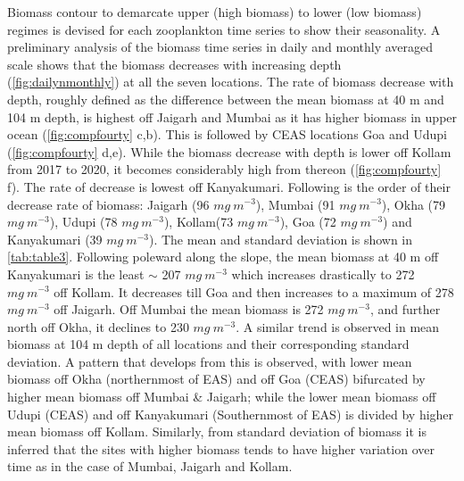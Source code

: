 \documentclass{article}
\begin{document}
	Biomass contour to demarcate upper (high biomass) to lower (low biomass) regimes is devised for each zooplankton time series to show their seasonality. A preliminary analysis of the biomass time series in daily and monthly averaged scale shows that the biomass decreases with increasing depth (\cref{fig:dailynmonthly}) at all the seven locations. The rate of biomass decrease with depth, roughly defined as the difference between the mean biomass at 40 m  and 104 m depth, is highest off Jaigarh and Mumbai as it has higher biomass in upper ocean (\cref{fig:compfourty} c,b). This is followed by CEAS locations Goa and Udupi (\cref{fig:compfourty} d,e). While the biomass decrease with depth is lower off Kollam from 2017 to 2020, it becomes considerably high from thereon (\cref{fig:compfourty} f). The rate of decrease is lowest off Kanyakumari. Following is the order of their decrease rate of biomass: Jaigarh (96 $mg\ m^{-3}$), Mumbai (91 $mg\ m^{-3}$), Okha (79 $mg\ m^{-3}$), Udupi (78 $mg\ m^{-3}$), Kollam(73 $mg\ m^{-3}$), Goa (72 $mg\ m^{-3}$) and Kanyakumari (39 $mg\ m^{-3}$).  The mean and standard deviation is shown in \autoref{tab:table3}. Following poleward along the slope, the mean biomass at 40 m off Kanyakumari is the least $\sim$ 207 $mg\ m^{-3}$ which increases drastically to 272 $mg\ m^{-3}$ off Kollam. It decreases till Goa and then increases to a maximum of 278 $mg\ m^{-3}$ off Jaigarh. Off Mumbai the mean biomass is 272 $mg\ m^{-3}$, and further north off Okha, it declines to 230 $mg\ m^{-3}$. A similar trend is observed in mean biomass at 104 m depth of all locations and their corresponding standard deviation. A pattern that develops from this is observed, with lower mean biomass off Okha (northernmost of EAS) and off Goa (CEAS) bifurcated by higher mean biomass off Mumbai \& Jaigarh; while the lower mean biomass off Udupi (CEAS) and off Kanyakumari (Southernmost of EAS) is divided by higher mean biomass off Kollam. Similarly, from standard deviation of biomass it is inferred that the sites with higher biomass tends to have higher variation over time as in the case of Mumbai, Jaigarh and Kollam. 
	
\end{document}
